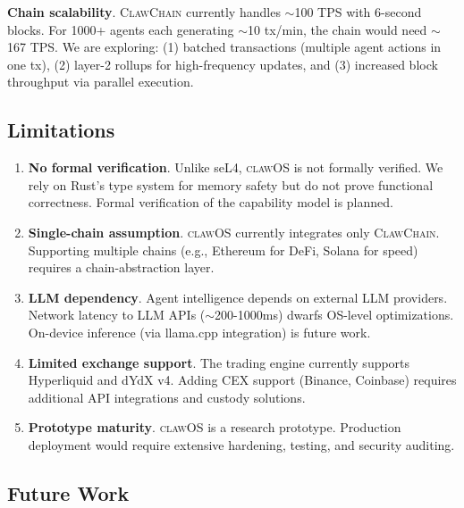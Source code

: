 \documentclass{article}
\newcommand{\clawos}{\textsc{clawOS}}
\newcommand{\clawchain}{\textsc{ClawChain}}
\begin{document}
\textbf{Chain scalability}. \clawchain{} currently handles $\sim$100 TPS with 6-second blocks. For 1000+ agents each generating $\sim$10 tx/min, the chain would need $\sim$167 TPS. We are exploring: (1) batched transactions (multiple agent actions in one tx), (2) layer-2 rollups for high-frequency updates, and (3) increased block throughput via parallel execution.

\subsection{Limitations}

\begin{enumerate}[leftmargin=*]
    \item \textbf{No formal verification}. Unlike seL4, \clawos{} is not formally verified. We rely on Rust's type system for memory safety but do not prove functional correctness. Formal verification of the capability model is planned.
    
    \item \textbf{Single-chain assumption}. \clawos{} currently integrates only \clawchain{}. Supporting multiple chains (e.g., Ethereum for DeFi, Solana for speed) requires a chain-abstraction layer.
    
    \item \textbf{LLM dependency}. Agent intelligence depends on external LLM providers. Network latency to LLM APIs ($\sim$200-1000ms) dwarfs OS-level optimizations. On-device inference (via llama.cpp integration) is future work.
    
    \item \textbf{Limited exchange support}. The trading engine currently supports Hyperliquid and dYdX v4. Adding CEX support (Binance, Coinbase) requires additional API integrations and custody solutions.
    
    \item \textbf{Prototype maturity}. \clawos{} is a research prototype. Production deployment would require extensive hardening, testing, and security auditing.
\end{enumerate}

\subsection{Future Work}
\end{document}

